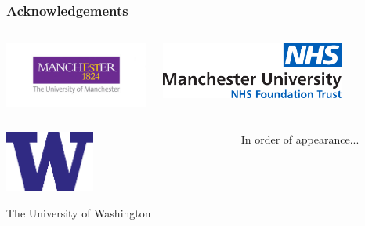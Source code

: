 \documentclass{beamer}
\begin{document}
%


\begin{frame}
    \frametitle{Acknowledgements}
    \begin{columns}
        \begin{column}{0.5\textwidth}
        \includegraphics[width=\textwidth]{figures/logo_big.jpg}
        \end{column}
        \begin{column}{0.5\textwidth}
        \includegraphics[width=0.75\textwidth]{figures/MFT-logo}
        \end{column}
    \end{columns}
    \begin{columns}
        \begin{column}{0.5\textwidth}
        \begin{center}
        \includegraphics[width=0.4\textwidth]{figures/W-Logo_Purple1}
        \end{center}

        The University of Washington
        \end{column}
        \begin{column}{0.5\textwidth}
        In order of appearance...


\end{column}
\end{columns}
\end{frame}
\end{document}
